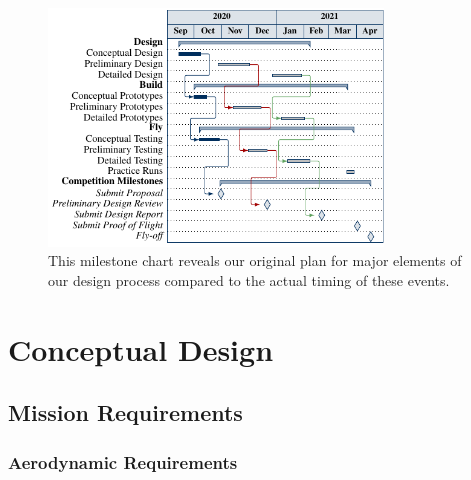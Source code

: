 \documentclass[report]{byu-aero}
\begin{document}


\begin{figure}[h!]
	\centering
	\includegraphics[width=3.5in]{ganttchart.pdf}
	\caption{This milestone chart reveals our original plan for major elements of our design process compared to the actual timing of these events.}
	\label{fig:plannedvsactualtiming}
\end{figure}

\section{Conceptual Design} %
\label{sec:ConceptualDesign}


\subsection{Mission Requirements}
\label{ssec:missionreqs}



\subsubsection{Aerodynamic Requirements}
\label{sssec:aeroreqs}
\end{document}
